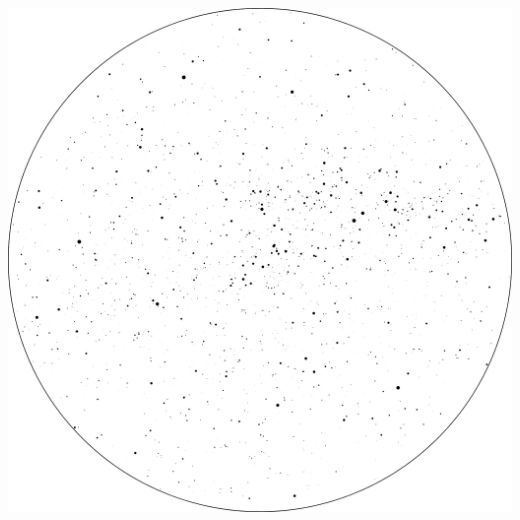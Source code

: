 \documentclass{SAS-class-skygen}
\begin{document}
	\vspace{0.5cm}
    \begin{center}
    \includegraphics[width=\textwidth]{./pics/sky_chart5.png}
    \end{center}
    
    
\end{document}
